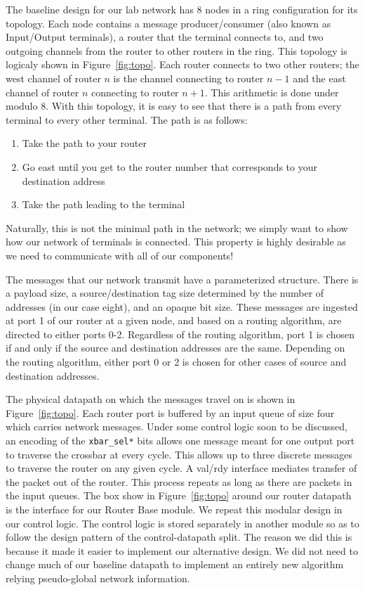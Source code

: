 \documentclass[10pt]{article}
\begin{document}
The baseline design for our lab network has 8 nodes in a ring configuration
for its topology. 
Each node contains a message producer/consumer (also known as Input/Output 
terminals), a router that the terminal connects to,
and two outgoing channels from the router to other routers in the ring.
This topology is logicaly shown in Figure~\ref{fig:topo}. 
Each router connects to two other routers; the west channel of router $n$ 
is the channel connecting to router $n-1$ and 
the east channel of router $n$ connecting to router $n+1$.
This arithmetic is done under modulo 8.
With this topology, it is easy to see that there is a path from every terminal
to every other terminal.
The path is as follows:
\begin{enumerate}[nolistsep]
	\item Take the path to your router
	\item Go east until you get to the router number that corresponds to your 
		  destination address
	\item Take the path leading to the terminal
\end{enumerate}
Naturally, this is not the minimal path in the network; we simply want to show
how our network of terminals is connected.
This property is highly desirable as we need to communicate with 
all of our components! \par

The messages that our network transmit have a parameterized structure.
There is a payload size, a source/destination tag size determined by the number
of addresses (in our case eight), and an opaque bit size.
These messages are ingested at port 1 of our router at a given node, and based
on a routing algorithm, are directed to either ports 0-2.
Regardless of the routing algorithm, port 1 is chosen if and only if 
the source and destination addresses are the same.
Depending on the routing algorithm, either port 0 or 2 is chosen for other
cases of source and destination addresses. \par

The physical datapath on which the messages travel on is shown in 
Figure~\ref{fig:topo}.
Each router port is buffered by an input queue of size four which carries
network messages. 
Under some control logic soon to be discussed, an encoding of the 
\texttt{xbar\_sel*} bits allows one message meant for one output port to
traverse the crossbar at every cycle.
This allows up to three discrete messages to traverse the router on any 
given cycle.
A val/rdy interface mediates transfer of the packet out of the router. 
This process repeats as long as there are packets in the input queues.
The box show in Figure~\ref{fig:topo} around our router datapath is the 
interface for our Router Base module. 
We repeat this modular design in our control logic.
The control logic is stored separately in another module so as to follow the
design pattern of the control-datapath split. 
The reason we did this is because it made it easier to implement our 
alternative design.
We did not need to change much of our baseline datapath to implement an 
entirely new algorithm relying pseudo-global network information. \par
\end{document}
